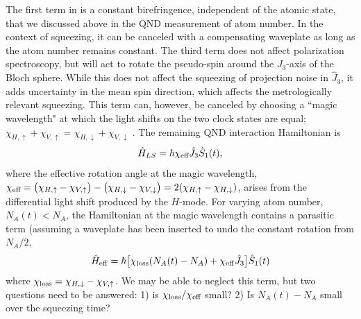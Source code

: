 \documentclass[preprint,aps,pra,onecolumn]{revtex4-1} %
\newcommand{\chieff}{\chi_{\rm eff}}
\newcommand{\comment}[1]{{\color{Maroon} #1}}
\begin{document}
The first term in  is a constant birefringence, independent of the atomic state, that we discussed above in the QND measurement of atom number.  In the context of squeezing, it can be canceled with a compensating waveplate as long as the atom number remains constant. The third term does not affect polarization spectroscopy, but will act to rotate the pseudo-spin around the $J_3$-axis of the Bloch sphere.  While this does not affect the squeezing of projection noise in $\hat{J}_3$, it adds uncertainty in the mean spin direction, which affects the metrologically relevant squeezing.  This term can, however, be canceled by choosing a ``magic wavelength" at which the light shifts on the two clock states are equal; $\chi_{H,\uparrow} +\chi_{V,\uparrow}  = \chi_{H,\downarrow} + \chi_{V,\downarrow}$ \cite{chaudhury_continuous_2006}. The remaining QND interaction Hamiltonian is
	\begin{equation} \label{Eq::FaradayHam}
		\hat{H}_{LS} = \hbar \chi_{\text{eff}} \hat{J}_3 \hat{S}_1(t),
	\end{equation}
where the effective rotation angle at the magic wavelength,
$\chi_{\text{eff}} = \big( \chi_{H, \uparrow} - \chi_{V,\uparrow} \big) - \big(\chi_{H,\downarrow} - \chi_{V,\downarrow} \big) = 2(\chi_{H, \uparrow}-\chi_{H, \downarrow})$, arises from the differential light shift produced by the $H$-mode.  \comment{For varying atom number, $N_A(t) < N_A$, the Hamiltonian at the magic wavelength contains a parasitic term (assuming a waveplate has been inserted to undo the constant rotation from $N_A/2$,
	\begin{align}
		\hat{H}_{\rm eff} = \hbar \big[ \chi_{\rm loss} (N_A(t)-N_A) + \chieff \hat{J}_3 \big]\hat{S}_1(t)
	\end{align}
where $\chi_{\rm loss} = \chi_{H,\downarrow} - \chi_{V,\uparrow}$.  We may be able to neglect this term, but two questions need to be answered: 1) is $\chi_{\rm loss}/\chieff$ small?  2) Is $N_A(t) - N_A$ small over the squeezing time?	}
\end{document}
